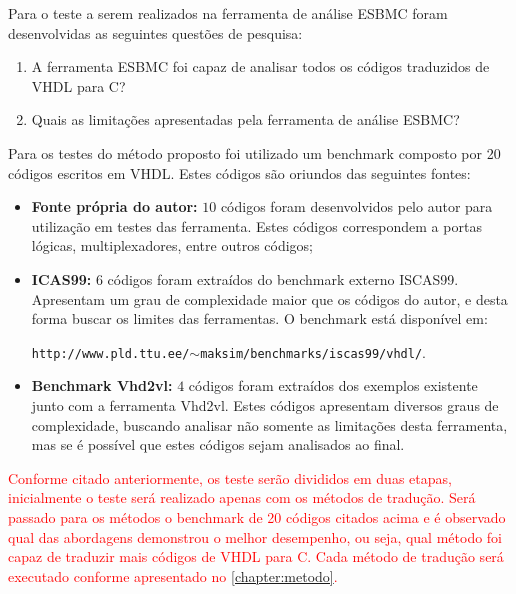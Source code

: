 \par 
Para o teste a serem realizados na ferramenta de análise ESBMC foram desenvolvidas as seguintes questões de pesquisa: 
\begin{enumerate} 
    \item A ferramenta ESBMC foi capaz de analisar todos os códigos traduzidos de VHDL para C? 
    \item Quais as limitações apresentadas pela ferramenta de análise ESBMC? 
\end{enumerate} 

\par 
Para os testes do método proposto foi utilizado um benchmark composto por 20 códigos escritos em VHDL. Estes códigos são oriundos das seguintes fontes: 

\begin{itemize} 
    \item \textbf{Fonte própria do autor:} $10$ códigos foram desenvolvidos pelo autor para utilização em testes das ferramenta. Estes códigos correspondem a portas lógicas, multiplexadores, entre outros códigos;  
    \item \textbf{ICAS99:} $6$ códigos foram extraídos do benchmark externo ISCAS99. Apresentam um grau de complexidade maior que os códigos do autor, e desta forma buscar os limites das ferramentas. O benchmark está disponível em:
    
    \texttt{http://www.pld.ttu.ee/$\sim$maksim/benchmarks/iscas99/vhdl/}.  
    
    \item \textbf{Benchmark Vhd2vl:} $4$ códigos foram extraídos dos exemplos existente junto com a ferramenta Vhd2vl. Estes códigos apresentam diversos graus de complexidade, buscando analisar não somente as limitações desta ferramenta, mas se é possível que estes códigos sejam analisados ao final. 
\end{itemize} 


\par
\textcolor{red}{Conforme citado anteriormente, os teste serão divididos em duas etapas, inicialmente o teste será realizado apenas com os métodos de tradução. Será passado para os métodos o benchmark de 20 códigos citados acima e é observado qual das abordagens demonstrou o melhor desempenho, ou seja, qual método foi capaz de traduzir mais códigos de VHDL para C. Cada método de tradução será executado conforme apresentado no \autoref{chapter:metodo}.}

